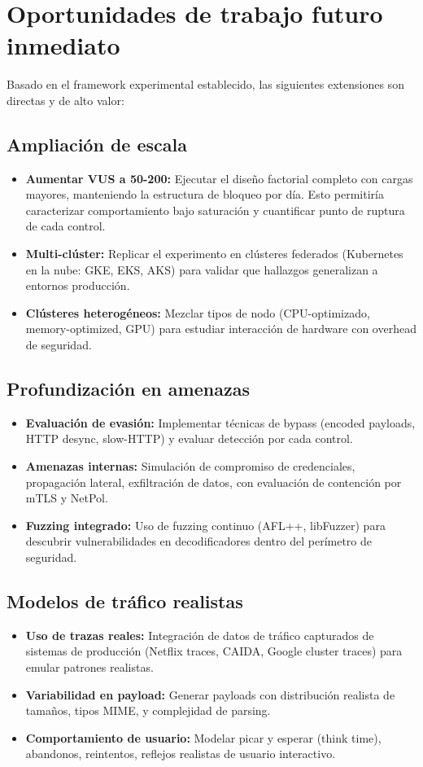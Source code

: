 \section{Oportunidades de trabajo futuro inmediato}

Basado en el framework experimental establecido, las siguientes extensiones son directas y de alto valor:

\subsection{Ampliación de escala}
\begin{itemize}
	\item \textbf{Aumentar VUS a 50-200:} Ejecutar el diseño factorial completo con cargas mayores, manteniendo la estructura de bloqueo por día. Esto permitiría caracterizar comportamiento bajo saturación y cuantificar punto de ruptura de cada control.
	\item \textbf{Multi-clúster:} Replicar el experimento en clústeres federados (Kubernetes en la nube: GKE, EKS, AKS) para validar que hallazgos generalizan a entornos producción.
	\item \textbf{Clústeres heterogéneos:} Mezclar tipos de nodo (CPU-optimizado, memory-optimized, GPU) para estudiar interacción de hardware con overhead de seguridad.
\end{itemize}

\subsection{Profundización en amenazas}
\begin{itemize}
	\item \textbf{Evaluación de evasión:} Implementar técnicas de bypass (encoded payloads, HTTP desync, slow-HTTP) y evaluar detección por cada control.
	\item \textbf{Amenazas internas:} Simulación de compromiso de credenciales, propagación lateral, exfiltración de datos, con evaluación de contención por mTLS y NetPol.
	\item \textbf{Fuzzing integrado:} Uso de fuzzing continuo (AFL++, libFuzzer) para descubrir vulnerabilidades en decodificadores dentro del perímetro de seguridad.
\end{itemize}

\subsection{Modelos de tráfico realistas}
\begin{itemize}
	\item \textbf{Uso de trazas reales:} Integración de datos de tráfico capturados de sistemas de producción (Netflix traces, CAIDA, Google cluster traces) para emular patrones realistas.
	\item \textbf{Variabilidad en payload:} Generar payloads con distribución realista de tamaños, tipos MIME, y complejidad de parsing.
	\item \textbf{Comportamiento de usuario:} Modelar picar y esperar (think time), abandonos, reintentos, reflejos realistas de usuario interactivo.
\end{itemize}

